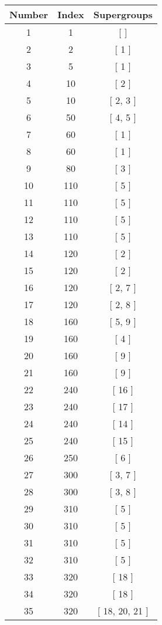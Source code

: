 \begin{center}
\begin{longtable}[H]{|| c c c ||}
\hline
Number & Index & Supergroups \\ 
\hline
1 & 1 & [ ] \\ 
\hline
2 & 2 & [ 1 ] \\ 
\hline
3 & 5 & [ 1 ] \\ 
\hline
4 & 10 & [ 2 ] \\ 
\hline
5 & 10 & [ 2, 3 ] \\ 
\hline
6 & 50 & [ 4, 5 ] \\ 
\hline
7 & 60 & [ 1 ] \\ 
\hline
8 & 60 & [ 1 ] \\ 
\hline
9 & 80 & [ 3 ] \\ 
\hline
10 & 110 & [ 5 ] \\ 
\hline
11 & 110 & [ 5 ] \\ 
\hline
12 & 110 & [ 5 ] \\ 
\hline
13 & 110 & [ 5 ] \\ 
\hline
14 & 120 & [ 2 ] \\ 
\hline
15 & 120 & [ 2 ] \\ 
\hline
16 & 120 & [ 2, 7 ] \\ 
\hline
17 & 120 & [ 2, 8 ] \\ 
\hline
18 & 160 & [ 5, 9 ] \\ 
\hline
19 & 160 & [ 4 ] \\ 
\hline
20 & 160 & [ 9 ] \\ 
\hline
21 & 160 & [ 9 ] \\ 
\hline
22 & 240 & [ 16 ] \\ 
\hline
23 & 240 & [ 17 ] \\ 
\hline
24 & 240 & [ 14 ] \\ 
\hline
25 & 240 & [ 15 ] \\ 
\hline
26 & 250 & [ 6 ] \\ 
\hline
27 & 300 & [ 3, 7 ] \\ 
\hline
28 & 300 & [ 3, 8 ] \\ 
\hline
29 & 310 & [ 5 ] \\ 
\hline
30 & 310 & [ 5 ] \\ 
\hline
31 & 310 & [ 5 ] \\ 
\hline
32 & 310 & [ 5 ] \\ 
\hline
33 & 320 & [ 18 ] \\ 
\hline
34 & 320 & [ 18 ] \\ 
\hline
35 & 320 & [ 18, 20, 21 ] \\ 

\end{longtable}
\end{center}
